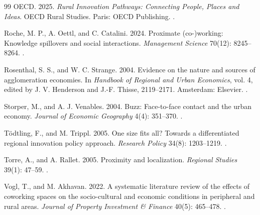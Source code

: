 \begin{thebibliography}{99}
OECD. 2025. \emph{Rural Innovation Pathways: Connecting People, Places and Ideas}. OECD Rural Studies. Paris: OECD Publishing. .

Roche, M. P., A. Oettl, and C. Catalini. 2024. Proximate (co-)working: Knowledge spillovers and social interactions. \emph{Management Science} 70(12): 8245--8264. .

Rosenthal, S. S., and W. C. Strange. 2004. Evidence on the nature and sources of agglomeration economies. In \emph{Handbook of Regional and Urban Economics}, vol. 4, edited by J. V. Henderson and J.-F. Thisse, 2119--2171. Amsterdam: Elsevier. .

Storper, M., and A. J. Venables. 2004. Buzz: Face-to-face contact and the urban economy. \emph{Journal of Economic Geography} 4(4): 351--370. .

T{\"o}dtling, F., and M. Trippl. 2005. One size fits all? Towards a differentiated regional innovation policy approach. \emph{Research Policy} 34(8): 1203--1219. .

Torre, A., and A. Rallet. 2005. Proximity and localization. \emph{Regional Studies} 39(1): 47--59. .

Vogl, T., and M. Akhavan. 2022. A systematic literature review of the effects of coworking spaces on the socio-cultural and economic conditions in peripheral and rural areas. \emph{Journal of Property Investment \& Finance} 40(5): 465--478. .

\end{thebibliography}
